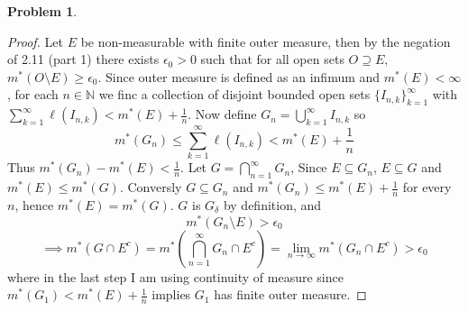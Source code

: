 \documentclass{article}
\newcommand{\N}{\mathbb{N}}
\newcommand{\m}{m^*}
\newtheorem{prb}{Problem}
\begin{document}
	    \begin{prb}  \end{prb} 
	    \begin{proof} 
	    	Let $E$ be non-measurable with finite outer measure, then by the negation of 2.11 (part 1) 
		there exists $\epsilon_0 > 0$ such that for all open sets $O \supseteq E$,  $\m(O\setminus E) \geq \epsilon_0$. Since outer measure is defined as an infimum and 
		$\m(E) < \infty$, for each $n \in \N$ we finc a collection of disjoint bounded 
		open sets $\{I_{n, k}\}_{k =1}^\infty$ with 
		$\sum_{k =1}^\infty \ell(I_{n, k}) < \m(E) + \frac{1}{n} $. Now define 
		$G_n = \bigcup_{k = 1}^\infty I_{n, k}$ so 
		\[ \m(G_n) \leq \sum_{k =1}^\infty \ell(I_{n, k}) < \m(E) + \frac{1}{n} \] 
		Thus $\m(G_n) - \m(E) < \frac{1}{n}$. 
		Let $G = \bigcap_{n = 1}^\infty G_n$, 
		Since 	$E \subseteq G_n$, $E \subseteq G$ and $\m(E) \leq \m(G)$. Conversly $G \subseteq G_n$ 
		and $\m(G_n) \leq \m(E) + \frac{1}{n}$ for every $n$, hence $\m(E) = \m(G)$. 
		$G$ is $G_\delta$ by definition, and 
		\[ \m(G_n \setminus E) > \epsilon_0 \] 
		\[ \implies \m(G \cap E^c) = \m(\bigcap_{n=1}^\infty G_n \cap E^c) = \lim_{n \to \infty} \m(G_n \cap E^c) > \epsilon_0 \] 
		where in the last step I am using continuity of measure
		since $\m(G_1) < \m(E) + \tfrac{1}{n}$ implies $G_1$
		has finite outer measure. 
	    \end{proof} 
\end{document}
